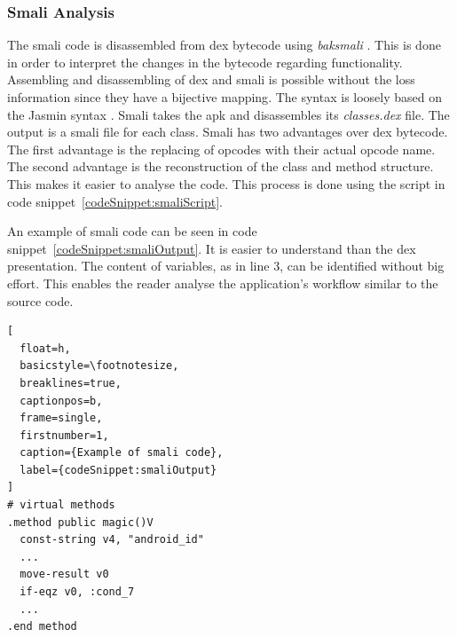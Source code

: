 \subsubsection{Smali Analysis} \label{subsection:tools-baksmali}
The smali code is disassembled from dex bytecode using \textit{baksmali} \cite{smali}.
This is done in order to interpret the changes in the bytecode regarding functionality.
\newline
Assembling and disassembling of dex and smali is possible without the loss information since they have a bijective mapping\cite{smali}.
The syntax is loosely based on the Jasmin syntax \cite{smali}.
Smali takes the \gls{apk} and disassembles its \textit{classes.dex} file.
The output is a smali file for each class.
Smali has two advantages over dex bytecode.
The first advantage is the replacing of opcodes with their actual opcode name.
The second advantage is the reconstruction of the class and method structure.
This makes it easier to analyse the code.
This process is done using the script in code snippet~\ref{codeSnippet:smaliScript}.
\newline

An example of smali code can be seen in code snippet~\ref{codeSnippet:smaliOutput}.
It is easier to understand than the dex presentation.
The content of variables, as in line 3, can be identified without big effort.
This enables the reader analyse the application's workflow similar to the source code.
\newline
\begin{lstlisting}[
  float=h,
  basicstyle=\footnotesize,
  breaklines=true,
  captionpos=b,
  frame=single,
  firstnumber=1,
  caption={Example of smali code},
  label={codeSnippet:smaliOutput}
]
# virtual methods
.method public magic()V
  const-string v4, "android_id"
  ...
  move-result v0
  if-eqz v0, :cond_7
  ...
.end method
\end{lstlisting}

